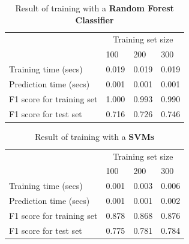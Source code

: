 \documentclass[12pt]{article}
\begin{document}
\setlength{\extrarowheight}{1.5pt}
\begin{table}[!htbp]
\caption{Result of training with a \textbf{Random Forest Classifier}} %
\centering %
\begin{tabular}{|p{6cm}|p{1.5cm}|p{1.5cm}|p{1.5cm}|} %
\hline %
& \multicolumn{3}{c|}{Training set size}\\[5pt]
\cline{2-4} 
& 100 & 200 & 300\\[0.5ex]
\hline %

Training time (secs)          &0.019 &0.019 &0.019\\
Prediction time (secs)        &0.001 &0.001 &0.001\\
F1 score for training set     &1.000 &0.993 &0.990\\
F1 score for test set         &0.716 &0.726 &0.746\\
\hline %
\end{tabular}
\label{randomForestClassifierTable}
\end{table}


\setlength{\extrarowheight}{1.5pt}
\begin{table}[!htbp]
\caption{Result of training with a \textbf{SVMs}} %
\centering %
\begin{tabular}{|p{6cm}|p{1.5cm}|p{1.5cm}|p{1.5cm}|} %
\hline %
& \multicolumn{3}{c|}{Training set size}\\[5pt]
\cline{2-4} 
& 100 & 200 & 300\\[0.5ex]
\hline %

Training time (secs)          &0.001 &0.003 &0.006\\
Prediction time (secs)        &0.001 &0.001 &0.002\\
F1 score for training set     &0.878 &0.868 &0.876\\
F1 score for test set         &0.775 &0.781 &0.784\\
\hline %
\end{tabular}
\label{svmTable}
\end{table}
\end{document}
